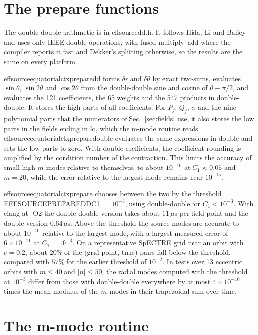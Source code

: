\documentclass[11pt]{article}
\newcommand{\codeus}{\textunderscore\allowbreak}
\newcommand{\codehy}{-\allowbreak}
\newcommand{\code}[1]{{\ttfamily\let\_\codeus\let\-\codehy #1}}
\begin{document}
\section{The prepare functions}
\label{sec:prepare}

The double-double arithmetic is in \code{effsource\_dd.h}. It follows Hida, Li
and Bailey and uses only IEEE double operations, with fused multiply--add where
the compiler reports it fast and Dekker's splitting otherwise, so the results
are the same on every platform.

\code{effsource\_equatorial\_ctx\_prepare\_dd} forms $\delta r$ and
$\delta\theta$ by exact two-sums, evaluates $\sin\theta$, $\sin2\theta$ and
$\cos2\theta$ from the double-double sine and cosine of $\theta-\pi/2$, and
evaluates the 121 coefficients, the 65 weights and the 547 products in
double-double. It stores the high parts of all coefficients. For $P_j$, $Q_j$,
$\alpha$ and the nine polynomial parts that the numerators of
Sec.~\ref{sec:fields} use, it also stores the low parts in the fields ending in
\code{\_lo}, which the m-mode routine reads.
\code{effsource\_equatorial\_ctx\_prepare\_double} evaluates the same
expressions in double and sets the low parts to zero. With double coefficients,
the coefficient rounding is amplified by the condition number of the
contraction. This limits the accuracy of small high-$m$ modes relative to
themselves, to about $10^{-10}$ at $C_1\approx0.05$ and $m=20$, while the
error relative to the largest mode remains near $10^{-15}$.

\code{effsource\_equatorial\_ctx\_prepare} chooses between the two by the
threshold \code{EFFSOURCE\_PREPARE\_DD\_C1} $=10^{-3}$, using double-double for
$C_1<10^{-3}$. With clang at \code{-O2} the double-double version takes about
$11\,\mu$s per field point and the double version $0.64\,\mu$s. Above the
threshold the source modes are accurate to about $10^{-10}$ relative to the
largest mode, with a largest measured error of $6\times10^{-11}$ at
$C_1=10^{-3}$. On a representative SpECTRE grid near an orbit with $e=0.2$,
about $20\%$ of the (grid point, time) pairs fall below the threshold,
compared with $57\%$ for the earlier threshold of $10^{-2}$. In tests over 13
eccentric orbits with $m\le40$ and $|n|\le50$, the radial modes computed with
the threshold at $10^{-3}$ differ from those with double-double everywhere by
at most $4\times10^{-10}$ times the mean modulus of the $m$-modes in their
trapezoidal sum over time.

\section{The m-mode routine}
\label{sec:mmode}
\end{document}
